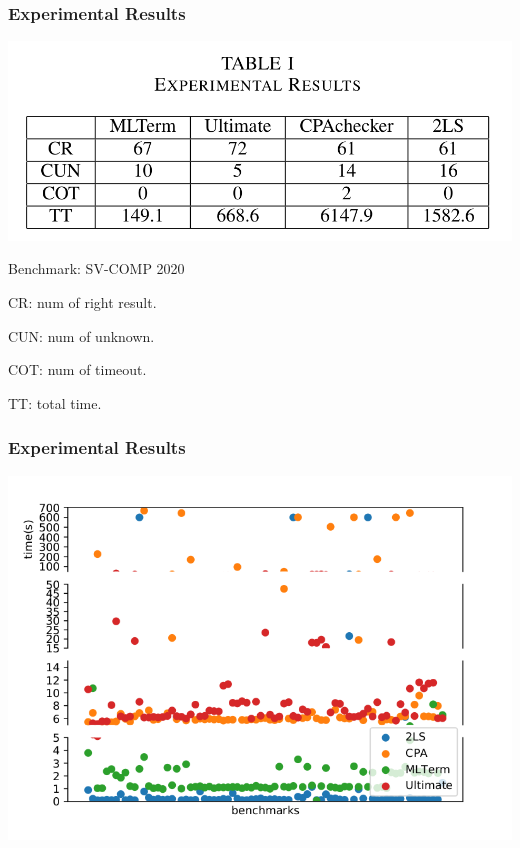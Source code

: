 \documentclass[11pt]{beamer}
\begin{document}
\begin{frame}\frametitle{Experimental Results}
\begin{center}
\includegraphics[scale=0.3]{general.png}
\end{center}
Benchmark: SV-COMP 2020

CR: num of right result. 

CUN: num of unknown.

COT: num of timeout.

TT: total time.
\end{frame}
\begin{frame}\frametitle{Experimental Results}
\begin{center}

\includegraphics[scale=0.4]{detailed.png}
\end{center}
\end{frame}
\end{document}
